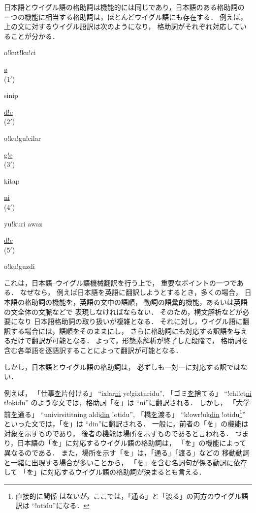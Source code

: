 日本語とウイグル語の格助詞は機能的には同じであり，日本語のある格助詞の
一つの機能に相当する格助詞は，ほとんどウイグル語にも存在する．
例えば，上の文に対するウイグル語訳は次のようになり，
格助詞がそれぞれ対応していることが分かる．

\begin{center}
o!kut!ku!ci\parbox[t]{3ex}{\underline{\o}\vspace{-1ex}\\ {\footnotesize ($1'$)}}
sinip\parbox[t]{3ex}{\underline{d!e}\vspace{-1ex}\\ {\footnotesize ($2'$)}}
o!ku!gu!cilar\parbox[t]{3ex}{\underline{g!e}\vspace{-1ex}\\ {\footnotesize ($3'$)}}
kitap\parbox[t]{3ex}{\underline{ni}\vspace{-1ex}\\ {\footnotesize ($4'$)}}
yu!kuri awaz\parbox[t]{3ex}{\underline{d!e}\vspace{-1ex}\\ {\footnotesize ($5'$)}}o!ku!guzdi
\end{center}

これは，日本語--ウイグル語機械翻訳を行う上で，
重要なポイントの一つである．
なぜなら，
例えば日本語を英語に翻訳しようとするとき，多くの場合，
日本語の格助詞の機能を，英語の文中の語順，
動詞の語彙的機能，あるいは英語の文全体の文脈などで
表現しなければならない．
そのため，構文解析などが必要になり
日本語格助詞の取り扱いが複雑となる．
それに対し，ウイグル語に翻訳する場合には，語順をそのままにし，
さらに格助詞にも対応する訳語を与えるだけで翻訳が可能となる．
よって，形態素解析が終了した段階で，
格助詞を含む各単語を逐語訳することによって翻訳が可能となる．

しかし，日本語とウイグル語の格助詞は，
必ずしも一対一に対応する訳ではない．

例えば，
「仕事\underline{を}片付ける」 ``ixlar\underline{ni} ye!gixturidu'',
「ゴミ\underline{を}捨てる」 ``!ehl!et\underline{ni} t!okidu''
のような文では，格助詞「を」は ``ni''に翻訳される．
しかし，
「大学前\underline{を}通る」 
``univirsititning aldi\underline{din} !otidu'',
「橋\underline{を}渡る」
``k!owr!uk\underline{din} !otidu\footnote{直接的に関係
はないが，ここでは，「通る」と「渡る」の両方のウイグル語訳は
``!otidu''になる．}''
といった文では，「を」は ``din''に翻訳される．
一般に，前者の「を」の機能は対象を示すものであり，
後者の機能は場所を示すものであると言われる．
つまり，日本語の「を」に対応するウイグル語の格助詞は，
「を」の機能によって異なるのである．
また，場所を示す「を」は，「通る」「渡る」などの
移動動詞と一緒に出現する場合が多いことから，
「を」を含む名詞句が係る動詞に依存して
「を」に対応するウイグル語の格助詞が決まるとも言える．

